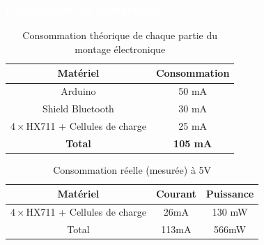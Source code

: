 \documentclass{beamer}
\begin{document}
\begin{frame}
\frametitle{\textcolor{white}{Consommation énergétique}}
\begin{table}
\begin{center}
\begin{tabular}{| c | c |}
\hline
\textbf{Matériel} & \textbf{Consommation} \\\hline\hline
Arduino & 50 mA \\\hline
Shield Bluetooth & 30 mA \\\hline
$4 \times$HX711 + Cellules de charge & 25 mA \\\hline
\textbf{Total} &  \textbf{105 mA} \\\hline
\end{tabular}
\end{center}
\caption{Consommation théorique de chaque partie du montage électronique}
\label{tab:consommation}
\end{table}


\begin{table}
\begin{center}
\begin{tabular}{| c | c | c |}
\hline
\textbf{Matériel} & \textbf{Courant} & \textbf{Puissance} \\ \hline \hline
$4\times$HX711 + Cellules de charge & 26mA &130 mW \\\hline
Total & 113mA & 566mW\\\hline
\end{tabular}
\end{center}
\caption{Consommation réelle (mesurée) à 5V}
\label{tab:consommation}
\end{table}
\end{frame}
\end{document}
